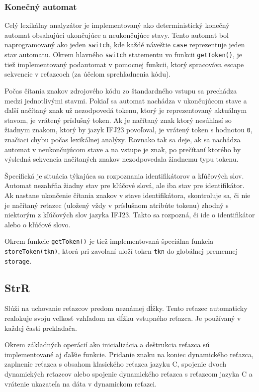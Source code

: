 \documentclass[a4paper,11pt]{article}
\begin{document}
\subsubsection{Konečný automat}
Celý lexikálny analyzátor je implementovaný ako deterministický konečný automat obsahujúci ukončujúce a neukončujúce stavy. Tento automat bol naprogramovaný ako jeden \texttt{switch}, kde každé náveštie \texttt{case} reprezentuje jeden stav automatu. Okrem hlavného \texttt{switch} statementu vo funkcii \texttt{getToken()}, je tiež implementovaný podautomat v pomocnej funkcii, ktorý spracováva escape sekvencie v reťazcoch (za účelom sprehľadnenia kódu).

Počas čítania znakov zdrojového kódu zo štandardného vstupu sa prechádza medzi jednotlivými stavmi. Pokiaľ sa automat nachádza v ukončujúcom stave a ďalší načítaný znak už nezodpovedá tokenu, ktorý je reprezentovaný aktuálnym stavom, je vrátený príslušný token. Ak je načítaný znak ktorý nesúhlasí so žiadnym znakom, ktorý by jazyk IFJ23 povoľoval, je vrátený token s hodnotou \texttt{0}, značiaci chybu počas lexikálnej analýzy. Rovnako tak sa deje, ak sa nachádza automat v neukončujúcom stave a na vstupe je znak, po prečítaní ktorého by výsledná sekvencia načítaných znakov nezodpovedala žiadnemu typu tokenu.

Špecifická je situácia týkajúca sa rozpoznania identifikátorov a kľúčových slov. Automat nezahŕňa žiadny stav pre kľúčové slová, ale iba stav pre identifikátor. Ak nastane ukončenie čítania znakov v stave identifikátora, skontroluje sa, či nie je načítaný reťazec (uložený vždy v príslušnom atribúte tokenu) zhodný s niektorým z kľúčových slov jazyka IFJ23. Takto sa rozpozná, či ide o identifikátor alebo o kľúčové slovo.

Okrem funkcie \texttt{getToken()} je tiež implementovaná špeciálna funkcia \texttt{storeToken(tkn)}, ktorá pri zavolaní uloží token \texttt{tkn} do globálnej premennej \texttt{storage}.

\subsection{StrR}
Slúži na uchovanie reťazcov predom neznámej dĺžky. Tento reťazec automaticky
realokuje svoju veľkosť vzhľadom na dĺžku vstupného reťazca. Je používaný v
každej časti prekladača.

Okrem základných operácií ako inicializácia a deštrukcia reťazca sú implementované aj ďalšie
funkcie. Pridanie znaku na koniec dynamického reťazca, zaplnenie reťazca s obsahom
klasického reťazca jazyku C, spojenie dvoch dynamických reťazcov alebo spojenie
dynamického reťazca s reťazcom jazyka C a vrátenie ukazateľa na dáta v dynamickom reťazci.
\end{document}
